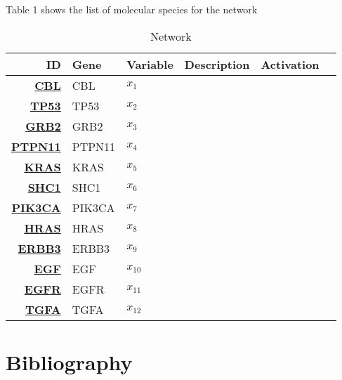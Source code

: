 Table 1 shows the list of molecular species for the network
\vspace{8pt}
\begin{table}[H]
	\begin{tabular}{rlllll}
		\hline
		ID & Gene & Variable & Description & Activation \\ 
		\hline
		\href{https://www.malacards.org/search/results/CBL}{\textbf{CBL}} & CBL & $x_1$ & & \\
		\href{https://www.malacards.org/search/results/TB53}{\textbf{TP53}} & TP53 & $x_2$ & & \\
		\href{https://www.malacards.org/search/results/GRB2}{\textbf{GRB2}} & GRB2 & $x_3$ & & \\
		\href{https://www.malacards.org/search/results/PTPN11}{\textbf{PTPN11}} & PTPN11 & $x_4$ & & \\ 
		\href{https://www.malacards.org/search/results/KRAS}{\textbf{KRAS}} & KRAS & $x_5$ & & \\
		\href{https://www.malacards.org/search/results/SHC1}{\textbf{SHC1}} & SHC1 & $x_6$ & & \\
		\href{https://www.malacards.org/search/results/PIK3CA}{\textbf{PIK3CA}} & PIK3CA & $x_7$ & & \\ 
		\href{https://www.malacards.org/search/results/HRAS}{\textbf{HRAS}} & HRAS & $x_8$ & & \\
		\href{https://www.malacards.org/search/results/ERBB3}{\textbf{ERBB3}} & ERBB3 & $x_9$ & & \\
		\href{https://www.malacards.org/search/results/EGF}{\textbf{EGF}} & EGF & $x_{10}$ & & \\
		\href{https://www.malacards.org/search/results/EGFR}{\textbf{EGFR}} & EGFR & $x_{11}$ & & \\
		\href{https://www.malacards.org/search/results/TGFA}{\textbf{TGFA}} & TGFA & $x_{12}$ & & \\
		\hline
	\end{tabular}
	\caption{Network}
	\label{tab:Table2}
\end{table}

\section{Bibliography}

